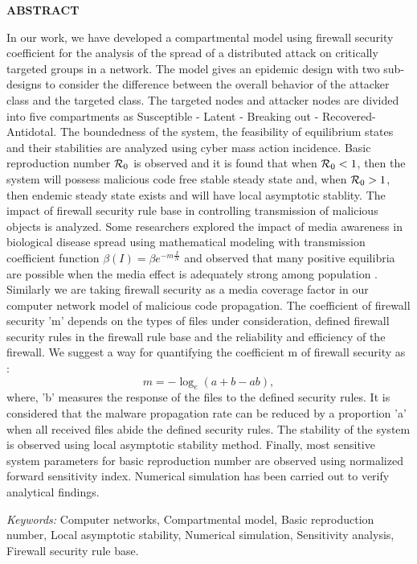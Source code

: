 \newpage
\quad
\newpage
\baselineskip=18pt
\begin{center}
{\large \bf ABSTRACT}
\end{center}

In our work, we have developed a compartmental model using firewall security coefficient for the analysis of the spread of a distributed attack on critically targeted groups in a network. The model gives an epidemic design with two sub-designs to consider the difference between the overall behavior of the attacker class and the targeted class. The targeted nodes and attacker nodes  are divided into five compartments as Susceptible - Latent - Breaking out - Recovered- Antidotal. The boundedness of the system, the feasibility of equilibrium states and their stabilities are analyzed using cyber mass action incidence. Basic reproduction number ${{\cal R}}_{0}$ is observed and it is found that when ${{\cal R}}_{0}<1$, then the system will possess malicious code free stable steady state and, when ${{\cal R}}_{0}>1$, then endemic steady state exists and will have local asymptotic stablity. The impact of firewall security rule base in controlling transmission of malicious objects is analyzed. Some researchers explored the impact of media awareness in biological disease spread using mathematical modeling with transmission coefficient function $\beta(I)=\beta e^{-m\frac{I}{N}}$ and observed that many positive equilibria are possible when the media effect is adequately strong among population \cite{cui2008impact,liu2008impact,sahu2012,sahu2015dynamics}. Similarly we are taking firewall security as a media coverage factor in our computer network model of malicious code propagation. The coefficient of firewall security 'm' depends on the types of files under consideration, defined firewall security rules in the firewall rule base and the reliability and efficiency of the firewall. We suggest a way for quantifying the coefficient m of firewall security as :
          $$m=-{\log_e (a+b-ab)},$$
where, 'b' measures the response of the files to the defined security rules. It is considered that the malware propagation rate can be reduced by a proportion 'a' when all received files abide the defined security rules.
The stability of the system is observed using local asymptotic stability method. Finally, most sensitive system parameters for basic reproduction number are observed using normalized forward sensitivity index. Numerical simulation has been carried out to verify analytical findings.


{\it Keywords:} Computer networks, Compartmental model, Basic reproduction number, Local asymptotic stability, Numerical simulation, Sensitivity analysis, Firewall security rule base. 